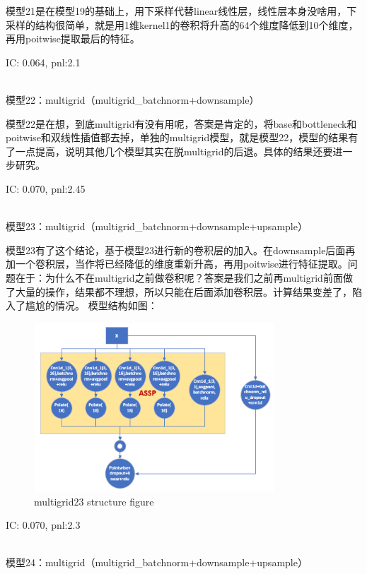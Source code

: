 \documentclass[11pt]{ctexart}
\begin{document}
模型21是在模型19的基础上，用下采样代替linear线性层，线性层本身没啥用，下采样的结构很简单，就是用1维kernel1的卷积将升高的64个维度降低到10个维度，再用poitwise提取最后的特征。

{\kaishu \small IC: 0.064, pnl:2.1}

~\\
模型22：multigrid（multigrid\_batchnorm+downsample）

模型22是在想，到底multigrid有没有用呢，答案是肯定的，将base和bottleneck和poitwise和双线性插值都去掉，单独的multigrid模型，就是模型22，模型的结果有了一点提高，说明其他几个模型其实在脱multigrid的后退。具体的结果还要进一步研究。

{\kaishu \small IC: 0.070, pnl:2.45}

~\\
模型23：multigrid（multigrid\_batchnorm+downsample+upsample）

模型23有了这个结论，基于模型23进行新的卷积层的加入。在downsample后面再加一个卷积层，当作将已经降低的维度重新升高，再用poitwise进行特征提取。问题在于：为什么不在multigrid之前做卷积呢？答案是我们之前再multigrid前面做了大量的操作，结果都不理想，所以只能在后面添加卷积层。计算结果变差了，陷入了尴尬的情况。
模型结构如图：
\begin{figure}[H]
\begin{center}
\includegraphics[width=0.8\textwidth]{str13.PNG}
\end{center}
\caption{multigrid23 structure figure}
\label{FIG.14}
\end{figure}

{\kaishu \small IC: 0.070, pnl:2.3}

~\\
模型24：multigrid（multigrid\_batchnorm+downsample+upsample）
\end{document}
